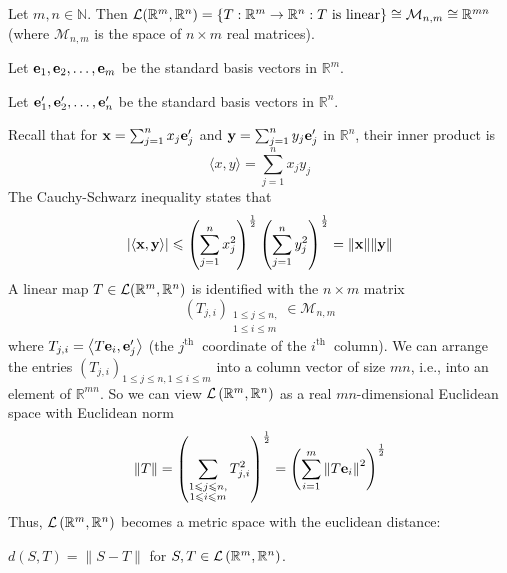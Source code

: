 \documentclass[a4paper,11pt]{article}
\begin{document}
Let $m, n \in \mathbb{N}$. Then ${\mathcal{L}}(\mathbb{R}^{m}, \mathbb{R}^{n})=\{T: \mathbb{R}^{m} \rightarrow \mathbb{R}^{n}: T \text{ is linear} \} \cong \mathcal{M}_{n, m} \cong \mathbb{R}^{m n}$ (where $\mathcal{M}_{n, m}$ is the space of $n \times m$ real matrices).

Let ${\bf e}_{1}, {\bf e}_{2}, \ldots, {\bf e}_{m}$ be the standard basis vectors in $\mathbb{R}^{m}$.

Let ${\bf e}_{1}^{\prime}, {\bf e}_{2}^{\prime}, \ldots, {\bf e}_{n}^{\prime}$ be the standard basis vectors in $\mathbb{R}^{n}$.

Recall that for ${\bf x}=\sum_{j=1}^{n} x_{j} {\bf e}_{j}^{\prime}$ and ${\bf y}=\sum_{j=1}^{n} y_{j} {\bf e}_{j}^{\prime}$ in $\mathbb{R}^{n}$, their inner product is
$$
\langle x, y\rangle=\sum_{j=1}^{n} x_{j} y_{j}
$$
The Cauchy-Schwarz inequality states that
$$
|\langle {\bf x}, {\bf y}\rangle| \leqslant\left(\sum_{j=1}^{n} x_{j}^{2}\right)^{\frac{1}{2}}\left(\sum_{j=1}^{n} y_{j}^{2}\right)^{\frac{1}{2}}=\|{\bf x}\|\|{\bf y}\|
$$
A linear map $T \in {\mathcal{L}}(\mathbb{R}^{m}, \mathbb{R}^{n})$ is identified with the $n \times m$ matrix
$$
\left(T_{j, i}\right)_{\substack{1 \leqslant j \leqslant n,\\ 1 \leqslant i \leqslant m}} \in \mathcal{M}_{n, m}
$$
where $T_{j, i}=\left\langle T {\bf e}_{i}, {\bf e}_{j}^{\prime}\right\rangle$ (the $j^{\text {th }}$ coordinate of the $i^{\text {th }}$ column). We can arrange the entries $\left(T_{j, i}\right)_{1 \leqslant j \leqslant n, 1 \leqslant i \leqslant m}$ into a column vector of size $m n$, i.e., into an element of $\mathbb{R}^{m n}$. So we can view ${\mathcal{L}}\left(\mathbb{R}^{m}, \mathbb{R}^{n}\right)$ as a real $mn$-dimensional Euclidean space with Euclidean norm
$$
\|T\|=\left(\sum_{\substack{1 \leqslant j \leqslant n,\\ 1 \leqslant i \leqslant m}} T_{j, i}^{2}\right)^{\frac{1}{2}}=\left(\sum_{i=1}^{m}\left\|T {\bf e}_{i}\right\|^{2}\right)^{\frac{1}{2}}
$$
Thus, ${\mathcal{L}}\left(\mathbb{R}^{m}, \mathbb{R}^{n}\right)$ becomes a metric space with the euclidean distance:

$d(S, T)=\|S-T\|$ for $S, T \in {\mathcal{L}}\left(\mathbb{R}^{m}, \mathbb{R}^{n}\right)$.
\end{document}
